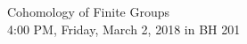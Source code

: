 \documentclass{article}
\title{}
\author{Duncan Bennett}
\date{}
\renewcommand{\ker}[1]{\text{ker} \hspace{1mm} #1}
\newcommand{\image}[1]{\text{image} \hspace{1mm} #1}
\theoremstyle{definition}
\newtheorem{defn}[theorem]{Definition}
\begin{document}
\begin{center}
    {\Large Cohomology of Finite Groups} \\ 4:00 PM, Friday, March 2, 2018 in BH 201
\end{center}



\end{document}
